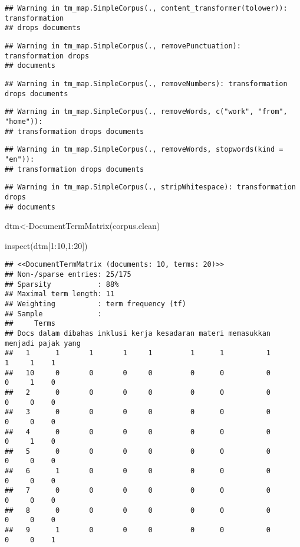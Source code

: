 \documentclass[
]{article}
\newenvironment{Shaded}{\begin{snugshade}}{\end{snugshade}}
\newcommand{\DecValTok}[1]{\textcolor[rgb]{0.00,0.00,0.81}{#1}}
\newcommand{\FunctionTok}[1]{\textcolor[rgb]{0.00,0.00,0.00}{#1}}
\newcommand{\NormalTok}[1]{#1}
\newcommand{\OtherTok}[1]{\textcolor[rgb]{0.56,0.35,0.01}{#1}}
\newcommand{\SpecialCharTok}[1]{\textcolor[rgb]{0.00,0.00,0.00}{#1}}
\begin{document}
\begin{verbatim}
## Warning in tm_map.SimpleCorpus(., content_transformer(tolower)): transformation
## drops documents
\end{verbatim}

\begin{verbatim}
## Warning in tm_map.SimpleCorpus(., removePunctuation): transformation drops
## documents
\end{verbatim}

\begin{verbatim}
## Warning in tm_map.SimpleCorpus(., removeNumbers): transformation drops documents
\end{verbatim}

\begin{verbatim}
## Warning in tm_map.SimpleCorpus(., removeWords, c("work", "from", "home")):
## transformation drops documents
\end{verbatim}

\begin{verbatim}
## Warning in tm_map.SimpleCorpus(., removeWords, stopwords(kind = "en")):
## transformation drops documents
\end{verbatim}

\begin{verbatim}
## Warning in tm_map.SimpleCorpus(., stripWhitespace): transformation drops
## documents
\end{verbatim}

\begin{Shaded}
\begin{Highlighting}[]
\NormalTok{dtm}\OtherTok{\textless{}{-}}\FunctionTok{DocumentTermMatrix}\NormalTok{(corpus.clean)}

\FunctionTok{inspect}\NormalTok{(dtm[}\DecValTok{1}\SpecialCharTok{:}\DecValTok{10}\NormalTok{,}\DecValTok{1}\SpecialCharTok{:}\DecValTok{20}\NormalTok{])}
\end{Highlighting}
\end{Shaded}

\begin{verbatim}
## <<DocumentTermMatrix (documents: 10, terms: 20)>>
## Non-/sparse entries: 25/175
## Sparsity           : 88%
## Maximal term length: 11
## Weighting          : term frequency (tf)
## Sample             :
##     Terms
## Docs dalam dibahas inklusi kerja kesadaran materi memasukkan menjadi pajak yang
##   1      1       1       1     1         1      1          1       1     1    1
##   10     0       0       0     0         0      0          0       0     1    0
##   2      0       0       0     0         0      0          0       0     0    0
##   3      0       0       0     0         0      0          0       0     0    0
##   4      0       0       0     0         0      0          0       0     1    0
##   5      0       0       0     0         0      0          0       0     0    0
##   6      1       0       0     0         0      0          0       0     0    0
##   7      0       0       0     0         0      0          0       0     0    0
##   8      0       0       0     0         0      0          0       0     0    0
##   9      1       0       0     0         0      0          0       0     0    1
\end{verbatim}
\end{document}
